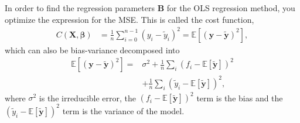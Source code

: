\documentclass[a4paper, 10pt]{article}
\begin{document}
\begin{multicols}{2}
In order to find the regression parameters $\bm{B}$ for the OLS regression method, you optimize the expression for the MSE. This is called the cost function,
\begin{align*}
C(\bm{X},\bm{\beta} ) &= \frac{1}{n}\sum_{i=0}^{n-1}(y_i-\tilde{y}_i)^2 = \mathbb{E}[	(\bm{y}-\bm{\tilde{y}})^2],
\end{align*}
which can also be bias-variance decomposed into
\begin{align}
 \mathbb{E}[	(\bm{y}-\bm{\tilde{y}})^2]  =&\sigma^2 + \frac{1}{n}\sum_i(f_i-\mathbb{E}\left[\bm{\tilde{y}}\right])^2  \nonumber \\
 &+ \frac{1}{n}\sum_i(\tilde{y}_i-\mathbb{E}\left[\bm{\tilde{y}}\right])^2,
 \label{eq:biasvariance}
\end{align}
where $\sigma^2$ is the irreducible error,  the $(f_i-\mathbb{E}\left[\bm{\tilde{y}}\right])^2$ term is the bias and the $(\tilde{y}_i-\mathbb{E}\left[\bm{\tilde{y}}\right])^2$ term is the variance of the model.


\end{multicols}
\end{document}
